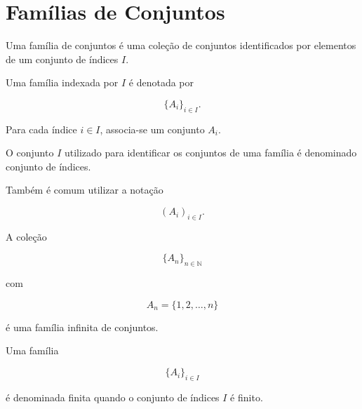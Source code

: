 \documentclass[../../main]{subfiles}
\begin{document}
\section{Famílias de Conjuntos}
\label{sec:matematica:teoria-conjuntos:familias-de-conjuntos}

\begin{defn}
	\label{def:matematica:teoria-conjuntos:familias-de-conjuntos:familia}

	Uma família de conjuntos é uma coleção de conjuntos identificados por
	elementos de um conjunto de índices \(I\).

	Uma família indexada por \(I\) é denotada por

	\[
		\{A_i\}_{i \in I}.
	\]

	Para cada índice \(i \in I\), associa-se um conjunto \(A_i\).

\end{defn}

\begin{defn}
	\label{def:matematica:teoria-conjuntos:familias-de-conjuntos:indices}

	O conjunto \(I\) utilizado para identificar os conjuntos de uma
	família é denominado conjunto de índices.
\end{defn}

\begin{obs}

	Também é comum utilizar a notação

	\[
		(A_i)_{i \in I}.
	\]

\end{obs}

\begin{ex}

	A coleção

	\[
		\{A_n\}_{n\in\mathbb{N}}
	\]

	com

	\[
		A_n=\{1,2,\dots,n\}
	\]

	é uma família infinita de conjuntos.

\end{ex}

\begin{defn}
	\label{def:matematica:teoria-conjuntos:familias-de-conjuntos:familia-finita}

	Uma família

	\[
		\{A_i\}_{i\in I}
	\]

	é denominada finita quando o conjunto de índices \(I\) é finito.

\end{defn}
\end{document}
